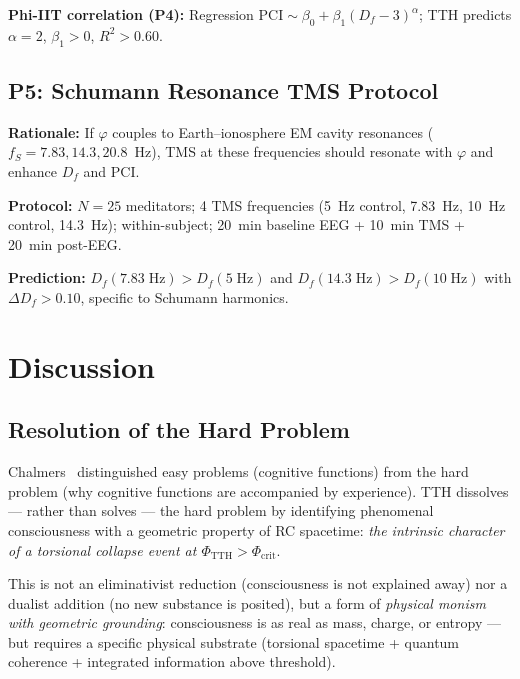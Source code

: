 \documentclass[12pt,a4paper]{article}
\newcommand{\phicrit}{\Phi_{\mathrm{crit}}}
\newcommand{\phiTTH}{\Phi_{\mathrm{TTH}}}
\numberwithin{equation}{section}
\begin{document}
\textbf{Phi-IIT correlation (P4):}
Regression $\mathrm{PCI} \sim \beta_0 + \beta_1(D_f-3)^{\alpha}$;
TTH predicts $\alpha=2$, $\beta_1>0$, $R^2>0.60$.

\subsection{P5: Schumann Resonance TMS Protocol}

\textbf{Rationale:} If $\varphi$ couples to Earth--ionosphere EM cavity
resonances ($f_S = 7.83, 14.3, 20.8$~Hz), TMS at these frequencies
should resonate with $\varphi$ and enhance $D_f$ and PCI.

\textbf{Protocol:} $N=25$ meditators; 4 TMS frequencies
(5~Hz control, 7.83~Hz, 10~Hz control, 14.3~Hz); within-subject;
20~min baseline EEG + 10~min TMS + 20~min post-EEG.

\textbf{Prediction:} $D_f(7.83\;\mathrm{Hz}) > D_f(5\;\mathrm{Hz})$ and
$D_f(14.3\;\mathrm{Hz}) > D_f(10\;\mathrm{Hz})$ with $\Delta D_f > 0.10$,
specific to Schumann harmonics.

\section{Discussion}
\label{sec:discussion}

\subsection{Resolution of the Hard Problem}

Chalmers~\citep{Chalmers1995} distinguished easy problems (cognitive functions)
from the hard problem (why cognitive functions are accompanied by experience).
TTH dissolves --- rather than solves --- the hard problem by identifying
phenomenal consciousness with a geometric property of RC spacetime:
\emph{the intrinsic character of a torsional collapse event at $\phiTTH > \phicrit$}.

This is not an eliminativist reduction (consciousness is not explained away)
nor a dualist addition (no new substance is posited),
but a form of \emph{physical monism with geometric grounding}:
consciousness is as real as mass, charge, or entropy --- but requires
a specific physical substrate (torsional spacetime + quantum coherence
+ integrated information above threshold).
\end{document}
